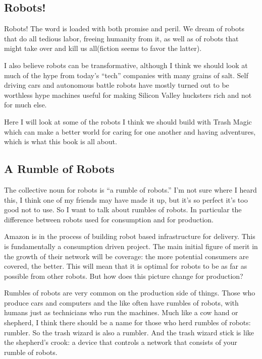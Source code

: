 \subsection{Robots!}\label{robots}

Robots! The word is loaded with both promise and peril. We dream of
robots that do all tedious labor, freeing humanity from it, as well as
of robots that might take over and kill us all(fiction seems to favor
the latter).

I also believe robots can be transformative, although I think we should
look at much of the hype from today's ``tech'' companies with many
grains of salt. Self driving cars and autonomous battle robots have
mostly turned out to be worthless hype machines useful for making
Silicon Valley hucksters rich and not for much else.

Here I will look at some of the robots I think we should build with
Trash Magic which can make a better world for caring for one another and
having adventures, which is what this book is all about.

\subsection{A Rumble of Robots}\label{a-rumble-of-robots}

The collective noun for robots is ``a rumble of robots.'' I'm not sure
where I heard this, I think one of my friends may have made it up, but
it's so perfect it's too good not to use. So I want to talk about
rumbles of robots. In particular the difference between robots used for
consumption and for production.

Amazon is in the process of building robot based infrastructure for
delivery. This is fundamentally a consumption driven project. The main
initial figure of merit in the growth of their network will be coverage:
the more potential consumers are covered, the better. This will mean
that it is optimal for robots to be as far as possible from other
robots. But how does this picture change for production?

Rumbles of robots are very common on the production side of things.
Those who produce cars and computers and the like often have rumbles of
robots, with humans just as technicians who run the machines. Much like
a cow hand or shepherd, I think there should be a name for those who
herd rumbles of robots: rumbler. So the trash wizard is also a rumbler.
And the trash wizard stick is like the shepherd's crook: a device that
controls a network that consists of your rumble of robots.

